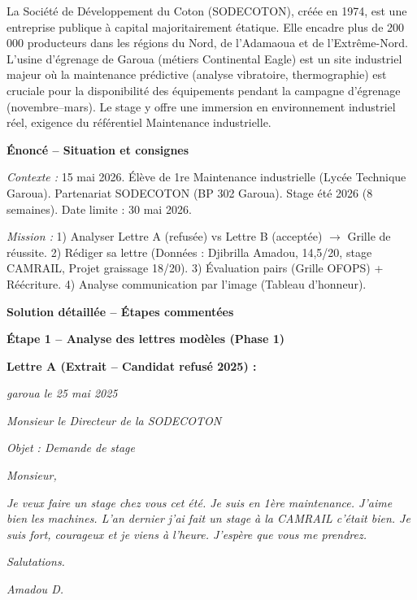 \documentclass[11pt]{article}
\begin{document}
\begin{savaistu}
La Société de Développement du Coton (SODECOTON), créée en 1974, est une entreprise publique à capital majoritairement étatique. Elle encadre plus de 200 000 producteurs dans les régions du Nord, de l'Adamaoua et de l'Extrême-Nord. L'usine d'égrenage de Garoua (métiers Continental Eagle) est un site industriel majeur où la maintenance prédictive (analyse vibratoire, thermographie) est cruciale pour la disponibilité des équipements pendant la campagne d'égrenage (novembre--mars). Le stage y offre une immersion en environnement industriel réel, exigence du référentiel Maintenance industrielle.
\end{savaistu}

\begin{exoresolu}
\textbf{Énoncé -- Situation et consignes}
\par
\emph{Contexte :} 15 mai 2026. Élève de 1re Maintenance industrielle (Lycée Technique Garoua). Partenariat SODECOTON (BP 302 Garoua). Stage été 2026 (8 semaines). Date limite : 30 mai 2026.
\par
\emph{Mission :} 1) Analyser Lettre A (refusée) vs Lettre B (acceptée) $\rightarrow$ Grille de réussite. 2) Rédiger sa lettre (Données : Djibrilla Amadou, 14,5/20, stage CAMRAIL, Projet graissage 18/20). 3) Évaluation pairs (Grille OFOPS) + Réécriture. 4) Analyse communication par l'image (Tableau d'honneur).

\tcblower

\textbf{Solution détaillée -- Étapes commentées}

\par
\textbf{Étape 1 -- Analyse des lettres modèles (Phase 1)}

\par
\textbf{Lettre A (Extrait -- Candidat refusé 2025) :}
\par
\emph{garoua le 25 mai 2025}
\par
\emph{Monsieur le Directeur de la SODECOTON}
\par
\emph{Objet : Demande de stage}
\par
\emph{Monsieur,}
\par
\emph{Je veux faire un stage chez vous cet été. Je suis en 1ère maintenance. J'aime bien les machines. L'an dernier j'ai fait un stage à la CAMRAIL c'était bien. Je suis fort, courageux et je viens à l'heure. J'espère que vous me prendrez.}
\par
\emph{Salutations.}
\par
\emph{Amadou D.}


\end{exoresolu}
\end{document}
